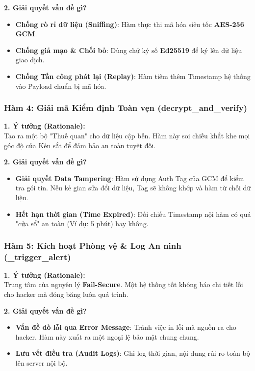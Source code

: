 \documentclass[11pt,a4paper]{article}
\begin{document}
\textbf{2. Giải quyết vấn đề gì?}
\begin{itemize}[noitemsep]
    \item \textbf{Chống rò rỉ dữ liệu (Sniffing)}: Hàm thực thi mã hóa siêu tốc \textbf{AES-256 GCM}.
    \item \textbf{Chống giả mạo \& Chối bỏ}: Dùng chữ ký số \textbf{Ed25519} để ký lên dữ liệu giao dịch.
    \item \textbf{Chống Tấn công phát lại (Replay)}: Hàm tiêm thêm Timestamp hệ thống vào Payload chuẩn bị mã hóa.
\end{itemize}

\subsubsection{Hàm 4: Giải mã Kiểm định Toàn vẹn (decrypt\_and\_verify)}
\textbf{1. Ý tưởng (Rationale):} \\
Tạo ra một bộ "Thuế quan" cho dữ liệu cập bến. Hàm này soi chiếu khắt khe mọi góc độ của Kén sắt để đảm bảo an toàn tuyệt đối.

\textbf{2. Giải quyết vấn đề gì?}
\begin{itemize}[noitemsep]
    \item \textbf{Giải quyết Data Tampering}: Hàm sử dụng Auth Tag của GCM để kiểm tra gói tin. Nếu kẻ gian sửa đổi dữ liệu, Tag sẽ không khớp và hàm từ chối dữ liệu.
    \item \textbf{Hết hạn thời gian (Time Expired)}: Đối chiếu Timestamp nội hàm có quá "cửa sổ" an toàn (Ví dụ: 5 phút) hay không.
\end{itemize}

\subsubsection{Hàm 5: Kích hoạt Phòng vệ \& Log An ninh (\_trigger\_alert)}
\textbf{1. Ý tưởng (Rationale):} \\
Trung tâm của nguyên lý \textbf{Fail-Secure}. Một hệ thống tốt không báo chi tiết lỗi cho hacker mà đóng băng luôn quá trình.

\textbf{2. Giải quyết vấn đề gì?}
\begin{itemize}[noitemsep]
    \item \textbf{Vấn đề dò lỗi qua Error Message}: Tránh việc in lỗi mã nguồn ra cho hacker. Hàm này xuất ra một ngoại lệ bảo mật chung chung.
    \item \textbf{Lưu vết điều tra (Audit Logs)}: Ghi log thời gian, nội dung rủi ro toàn bộ lên server nội bộ.
\end{itemize}
\end{document}
